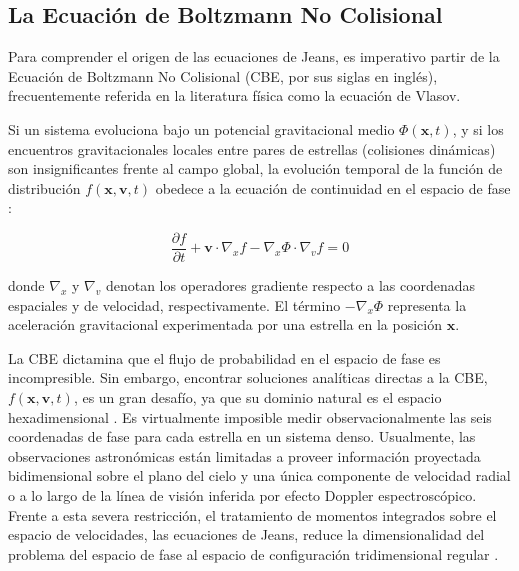         \subsection{La Ecuación de Boltzmann No Colisional}
            Para comprender el origen de las ecuaciones de Jeans, es imperativo 
            partir de la Ecuación de Boltzmann No Colisional (CBE, por sus 
            siglas en inglés), frecuentemente referida en la literatura física 
            como la ecuación de Vlasov.

            Si un sistema evoluciona bajo un potencial gravitacional medio 
            $\Phi(\mathbf{x}, t)$, y si los encuentros gravitacionales locales 
            entre pares de estrellas (colisiones dinámicas) son insignificantes 
            frente al campo global, la evolución temporal de la función de 
            distribución $f(\mathbf{x}, \mathbf{v}, t)$ obedece a la ecuación de 
            continuidad en el espacio de fase \cite{mamon2010kinematic}:

            $$\frac{\partial f}{\partial t} + \mathbf{v} \cdot \nabla_x f - 
            \nabla_x \Phi \cdot \nabla_v f = 0$$

            donde $\nabla_x$ y $\nabla_v$ denotan los operadores gradiente 
            respecto a las coordenadas espaciales y de velocidad, 
            respectivamente. El término $-\nabla_x \Phi$ representa la 
            aceleración gravitacional experimentada por una estrella en la 
            posición $\mathbf{x}$.

            La CBE dictamina que el flujo de probabilidad en el espacio de fase 
            es incompresible. Sin embargo, encontrar soluciones analíticas 
            directas a la CBE, $f(\mathbf{x}, \mathbf{v}, t)$, es un gran 
            desafío, ya que su dominio natural es el espacio hexadimensional 
            \cite{ciotti_2021_jeans}. Es virtualmente imposible medir 
            observacionalmente las seis coordenadas de fase para cada estrella 
            en un sistema denso. Usualmente, las observaciones astronómicas 
            están limitadas a proveer información proyectada bidimensional 
            sobre el plano del cielo y una única componente de velocidad radial 
            o a lo largo de la línea de visión inferida por efecto Doppler 
            espectroscópico. Frente a esta severa restricción,  el tratamiento 
            de momentos integrados sobre el espacio de velocidades, las 
            ecuaciones de Jeans, reduce la dimensionalidad del problema del 
            espacio de fase al espacio de configuración tridimensional regular 
            \cite{courteau2014galaxy}.

